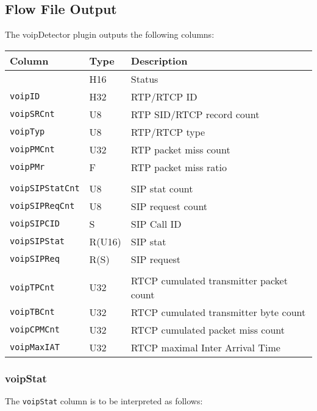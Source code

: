 \documentclass[documentation]{subfiles}
\begin{document}
\subsection{Flow File Output}
The voipDetector plugin outputs the following columns:

\begin{longtable}{lll}
    \toprule
    {\bf Column} & {\bf Type} & {\bf Description} \\
    \midrule\endhead%
    {\tt \nameref{voipStat}} & H16    & Status \\
    {\tt voipID}             & H32    & RTP/RTCP ID \\
    {\tt voipSRCnt}          & U8     & RTP SID/RTCP record count \\
    {\tt voipTyp}            & U8     & RTP/RTCP type \\
    {\tt voipPMCnt}          & U32    & RTP packet miss count \\
    {\tt voipPMr}            & F      & RTP packet miss ratio \\
    \\
    {\tt voipSIPStatCnt}     & U8     & SIP stat count \\
    {\tt voipSIPReqCnt}      & U8     & SIP request count \\
    {\tt voipSIPCID}         & S      & SIP Call ID \\
    {\tt voipSIPStat}        & R(U16) & SIP stat \\
    {\tt voipSIPReq}         & R(S)   & SIP request \\
    \\
    {\tt voipTPCnt}          & U32    & RTCP cumulated transmitter packet count \\
    {\tt voipTBCnt}          & U32    & RTCP cumulated transmitter byte count \\
    {\tt voipCPMCnt}         & U32    & RTCP cumulated packet miss count\\
    {\tt voipMaxIAT}         & U32    & RTCP maximal Inter Arrival Time \\
    \bottomrule
\end{longtable}

\subsubsection{voipStat}\label{voipStat}
The {\tt voipStat} column is to be interpreted as follows:
\end{document}
